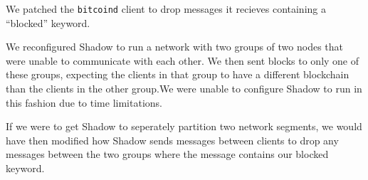 We patched the \texttt{bitcoind} client to drop messages it recieves containing a ``blocked'' keyword.

We reconfigured Shadow to run a network with two groups of two nodes that were unable to communicate with each other. We then sent blocks to only one of these groups, expecting the clients in that group to have a different blockchain than the clients in the other group.We were unable to configure Shadow to run in this fashion due to time limitations.

If we were to get Shadow to seperately partition two network segments, we would have then modified how Shadow sends messages between clients to drop any messages between the two groups where the message contains our blocked keyword.
